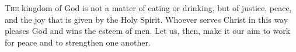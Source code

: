 
\lettrine{T}{he} kingdom of God is not a matter of eating or drinking, but of justice, peace, and the joy that is given by the Holy Spirit. Whoever serves Christ in this way pleases God and wins the esteem of men. Let us, then, make it our aim to work for peace and to strengthen one another.